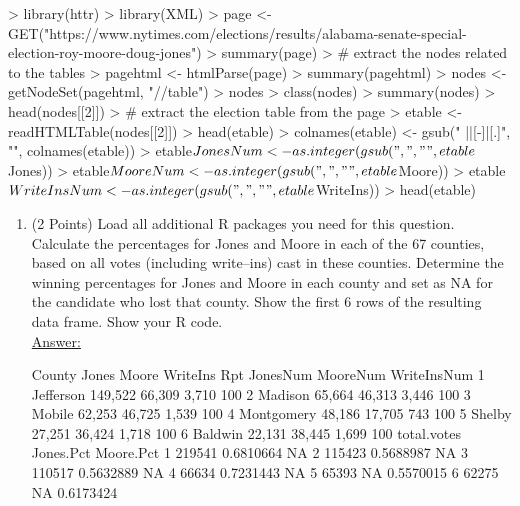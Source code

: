 \documentclass[12pt,letterpaper,final]{article}
\begin{document}
\begin{enumerate}
{\scriptsize
\begin{Schunk}
\begin{Sinput}
> library(httr)
> library(XML)
> page <- GET("https://www.nytimes.com/elections/results/alabama-senate-special-election-roy-moore-doug-jones")
> summary(page)
> # extract the nodes related to the tables
> pagehtml <- htmlParse(page)
> summary(pagehtml)
> nodes <- getNodeSet(pagehtml, "//table")
> nodes
> class(nodes)
> summary(nodes)
> head(nodes[[2]])
> # extract the election table from the page
> etable <- readHTMLTable(nodes[[2]])
> head(etable)
> colnames(etable) <- gsub(" |\n|[-]|[.]", "", colnames(etable))
> etable$JonesNum <- as.integer(gsub(",", "", etable$Jones))
> etable$MooreNum <- as.integer(gsub(",", "", etable$Moore))
> etable$WriteInsNum <- as.integer(gsub(",", "", etable$WriteIns))
> head(etable)
\end{Sinput}
\end{Schunk}
}


\newpage


\begin{enumerate}
\item (2 Points) 
Load all additional R packages you need for this question.
Calculate the percentages for Jones and Moore in each of the 67 counties,
based on all votes (including write--ins) cast in these counties.
Determine the winning percentages for Jones and Moore in each county
and set as NA for the candidate who lost that county. 
Show the first 6 rows of the resulting data frame.
Show your R code. \\


\underline{Answer:}
{\scriptsize
\begin{Schunk}
\begin{Soutput}
      County   Jones  Moore WriteIns  Rpt JonesNum MooreNum WriteInsNum
1  Jefferson 149,522 66,309    3,710 100%
2    Madison  65,664 46,313    3,446 100%
3     Mobile  62,253 46,725    1,539 100%
4 Montgomery  48,186 17,705      743 100%
5     Shelby  27,251 36,424    1,718 100%
6    Baldwin  22,131 38,445    1,699 100%
  total.votes Jones.Pct Moore.Pct
1      219541 0.6810664        NA
2      115423 0.5688987        NA
3      110517 0.5632889        NA
4       66634 0.7231443        NA
5       65393        NA 0.5570015
6       62275        NA 0.6173424
\end{Soutput}
\end{Schunk}
}



\end{enumerate}
\end{enumerate}
\end{document}

